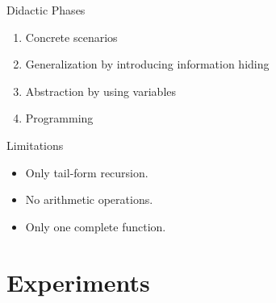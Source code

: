 \begin{frame}{Didactic Phases}
  \begin{enumerate}
  \item Concrete scenarios
  \item Generalization by introducing information hiding
  \item Abstraction by using variables
  \item Programming
  \end{enumerate}
\end{frame}

\begin{frame} {Limitations}
  \begin{itemize}
  \item Only tail-form recursion.
  \item No arithmetic operations.
  \item Only one complete function.
  \end{itemize}
\end{frame}

\section{Experiments}

